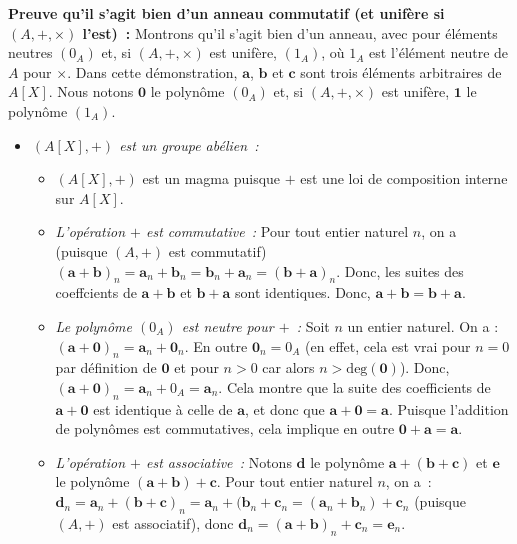 \noindent\textbf{Preuve qu'il s'agit bien d'un anneau commutatif (et unifère si $(A, +, \times)$ l'est) :} Montrons qu'il s'agit bien d'un anneau, avec pour éléments neutres $(0_A)$ et, si $(A, +, \times)$ est unifère, $(1_A)$, où $1_A$ est l'élément neutre de $A$ pour $\times$. 
Dans cette démonstration, $\mathbf{a}$, $\mathbf{b}$ et $\mathbf{c}$ sont trois éléments arbitraires de $A[X]$.
Nous notons $\mathbf{0}$ le polynôme $(0_A)$ et, si $(A, +, \times)$ est unifère, $\mathbf{1}$ le polynôme $(1_A)$.
\begin{itemize}[nosep]
    \item \textit{$(A[X], +)$ est un groupe abélien :}
        \begin{itemize}[nosep]
            \item $(A[X], +)$ est un magma puisque $+$ est une loi de composition interne sur $A[X]$.
            \item \textit{L'opération $+$ est commutative :} 
                Pour tout entier naturel $n$, on a (puisque $(A, +)$ est commutatif)
                $(\mathbf{a} + \mathbf{b})_n = \mathbf{a}_n + \mathbf{b}_n = \mathbf{b}_n + \mathbf{a}_n = (\mathbf{b} + \mathbf{a})_n$.
                Donc, les suites des coeffcients de $\mathbf{a} + \mathbf{b}$ et $\mathbf{b} + \mathbf{a}$ sont identiques.
                Donc, $\mathbf{a} + \mathbf{b} = \mathbf{b} + \mathbf{a}$.
            \item \textit{Le polynôme $(0_A)$ est neutre pour $+$ :} 
                Soit $n$ un entier naturel.
                On a : $(\mathbf{a} + \mathbf{0})_n = \mathbf{a}_n + \mathbf{0}_n$.
                En outre $\mathbf{0}_n = 0_A$ (en effet, cela est vrai pour $n = 0$ par définition de $\mathbf{0}$ et pour $n > 0$ car alors $n > \mathrm{deg}(\mathbf{0})$).
                Donc, $(\mathbf{a} + \mathbf{0})_n = \mathbf{a}_n + 0_A = \mathbf{a}_n$.
                Cela montre que la suite des coefficients de $\mathbf{a} + \mathbf{0}$ est identique à celle de $\mathbf{a}$, et donc que $\mathbf{a} + \mathbf{0} = \mathbf{a}$.
                Puisque l'addition de polynômes est commutatives, cela implique en outre $\mathbf{0} + \mathbf{a} = \mathbf{a}$.
            \item \textit{L'opération $+$ est associative :} 
                Notons $\mathbf{d}$ le polynôme $\mathbf{a} + (\mathbf{b} + \mathbf{c})$ et $\mathbf{e}$ le polynôme $(\mathbf{a} + \mathbf{b}) + \mathbf{c}$. 
                Pour tout entier naturel $n$, on a : $\mathbf{d}_n = \mathbf{a}_n + (\mathbf{b} + \mathbf{c})_n = \mathbf{a}_n + (\mathbf{b}_n + \mathbf{c}_n = (\mathbf{a}_n + \mathbf{b}_n) + \mathbf{c}_n$ (puisque $(A, +)$ est associatif), donc $\mathbf{d}_n = (\mathbf{a} + \mathbf{b})_n + \mathbf{c}_n = \mathbf{e}_n$.

\end{itemize}
\end{itemize}
